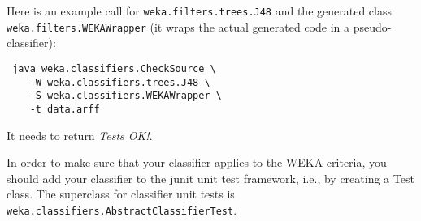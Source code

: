 Here is an example call for \texttt{weka.filters.trees.J48} and the
generated class \texttt{weka.filters.WEKAWrapper} (it wraps the actual generated
code in a pseudo-classifier):
\begin{verbatim}
 java weka.classifiers.CheckSource \
    -W weka.classifiers.trees.J48 \
    -S weka.classifiers.WEKAWrapper \
    -t data.arff
\end{verbatim}
It needs to return \textit{Tests OK!}.

In order to make sure that your classifier applies to the WEKA criteria, you
should add your classifier to the junit unit test framework, i.e., by creating a
Test class. The superclass for classifier unit tests is
\texttt{weka.classifiers.AbstractClassifierTest}.


